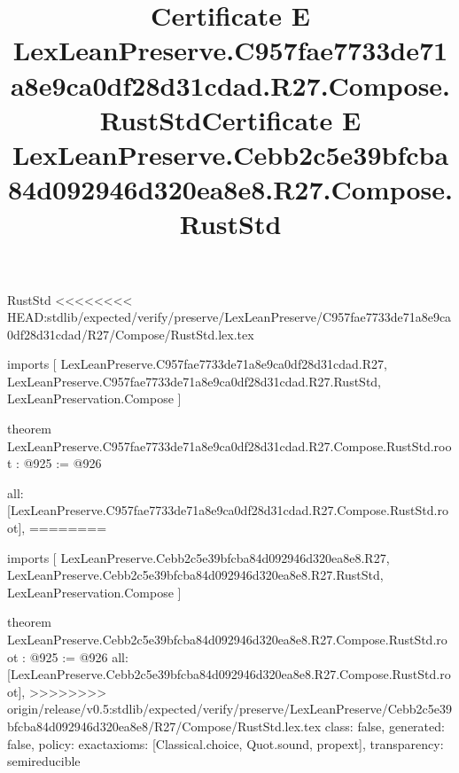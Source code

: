 \begin{lexlean}{RustStd}
<<<<<<<< HEAD:stdlib/expected/verify/preserve/LexLeanPreserve/C957fae7733de71a8e9ca0df28d31cdad/R27/Compose/RustStd.lex.tex
\title{Certificate E LexLeanPreserve.C957fae7733de71a8e9ca0df28d31cdad.R27.Compose.RustStd}
\begin{coremodule}
imports [
  LexLeanPreserve.C957fae7733de71a8e9ca0df28d31cdad.R27,
  LexLeanPreserve.C957fae7733de71a8e9ca0df28d31cdad.R27.RustStd,
  LexLeanPreservation.Compose
]

theorem LexLeanPreserve.C957fae7733de71a8e9ca0df28d31cdad.R27.Compose.RustStd.root : @925 := @926 {
  all: [LexLeanPreserve.C957fae7733de71a8e9ca0df28d31cdad.R27.Compose.RustStd.root],
========
\title{Certificate E LexLeanPreserve.Cebb2c5e39bfcba84d092946d320ea8e8.R27.Compose.RustStd}
\begin{coremodule}
imports [
  LexLeanPreserve.Cebb2c5e39bfcba84d092946d320ea8e8.R27,
  LexLeanPreserve.Cebb2c5e39bfcba84d092946d320ea8e8.R27.RustStd,
  LexLeanPreservation.Compose
]

theorem LexLeanPreserve.Cebb2c5e39bfcba84d092946d320ea8e8.R27.Compose.RustStd.root : @925 := @926 {
  all: [LexLeanPreserve.Cebb2c5e39bfcba84d092946d320ea8e8.R27.Compose.RustStd.root],
>>>>>>>> origin/release/v0.5:stdlib/expected/verify/preserve/LexLeanPreserve/Cebb2c5e39bfcba84d092946d320ea8e8/R27/Compose/RustStd.lex.tex
  class: false,
  generated: false,
  policy: exact{axioms: [Classical.choice, Quot.sound, propext]},
  transparency: semireducible
}


\end{coremodule}}
\end{coremodule}
\end{lexlean}

